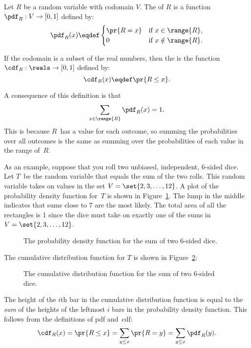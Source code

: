\begin{definition}
Let $R$ be a random variable with codomain $V$.
The  of $R$
is a function $\pdf_R : V \to [0,1]$ defined by:
%
\[
\pdf_R(x) \eqdef \begin{cases}
            \pr{R = x} & \text{if } x \in \range{R},\\
             0 & \text{if } x \notin \range{R}.
           \end{cases}
\]

If the codomain is a subset of the real numbers, then the
 is the function $\cdf_R :
\reals \to [0, 1]$ defined by:
%
\[
\cdf_R(x) \eqdef \pr{R \leq x}.
\]
\end{definition}
%
A consequence of this definition is that
%
\[
\sum_{x \in \range{R}} \pdf_R(x) = 1.
\]
This is because $R$~has a value for each outcome, so summing the
probabilities over all outcomes is the same as summing over the
probabilities of each value in the range of~$R$.

As an example, suppose that you roll two unbiased, independent,
6-sided dice.  Let $T$~be the random variable that equals the sum of
the two rolls.  This random variable takes on values in the set $V =
\set{2, 3, \dots, 12}$.  A plot of the probability density function
for~$T$ is shown in Figure~\ref{fig:16F2}.  The lump in the middle
indicates that sums close to 7 are the most likely.  The total area of
all the rectangles is 1 since the dice must take on exactly one of the
sums in $V = \set{2, 3, \dots, 12}$.

\begin{figure}


\caption{The probability density function for the sum of two 6-sided
  dice.}

\label{fig:16F2}

\end{figure}

The cumulative distribution function for $T$ is shown in
Figure~\ref{fig:16F3}:
%
\begin{figure}


\caption{The cumulative distribution function for the sum of two
  6-sided dice.}

\label{fig:16F3}

\end{figure}
%
The height of the $i$th bar in the cumulative distribution function
is equal to the \emph{sum} of the heights of the leftmost $i$ bars
in the probability density function.  This follows from the
definitions of pdf and~cdf:
\[
\cdf_R(x)  = \pr{R \leq x}
           = \sum_{y \leq x} \pr{R = y}
           = \sum_{y \leq x} \pdf_R(y).
\]

